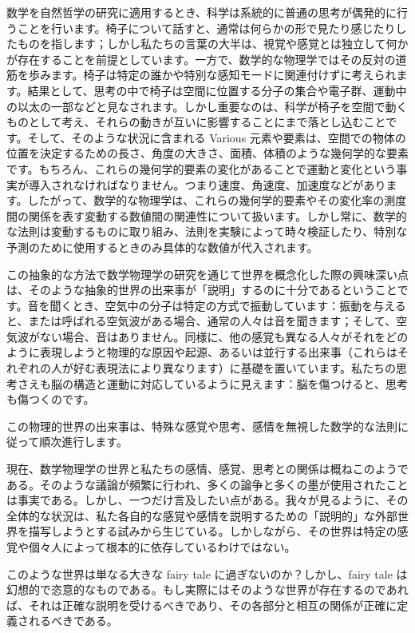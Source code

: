 \documentclass[a4paper,11pt,openany]{ltjsbook}
\begin{document}
数学を自然哲学の研究に適用するとき、科学は系統的に普通の思考が偶発的に行うことを行います。椅子について話すと、通常は何らかの形で見たり感じたりしたものを指します；しかし私たちの言葉の大半は、視覚や感覚とは独立して何かが存在することを前提としています。一方で、数学的な物理学ではその反対の道筋を歩みます。椅子は特定の誰かや特別な感知モードに関連付けずに考えられます。結果として、思考の中で椅子は空間に位置する分子の集合や電子群、運動中の以太の一部などと見なされます。しかし重要なのは、科学が椅子を空間で動くものとして考え、それらの動きが互いに影響することにまで落とし込むことです。そして、そのような状況に含まれる Various 元素や要素は、空間での物体の位置を決定するための長さ、角度の大きさ、面積、体積のような幾何学的な要素です。もちろん、これらの幾何学的要素の変化があることで運動と変化という事実が導入されなければなりません。つまり速度、角速度、加速度などがあります。したがって、数学的な物理学は、これらの幾何学的要素やその変化率の測度間の関係を表す変動する数値間の関連性について扱います。しかし常に、数学的な法則は変動するものに取り組み、法則を実験によって時々検証したり、特別な予測のために使用するときのみ具体的な数値が代入されます。

この抽象的な方法で数学物理学の研究を通じて世界を概念化した際の興味深い点は、そのような抽象的世界の出来事が「説明」するのに十分であるということです。音を聞くとき、空気中の分子は特定の方式で振動しています：振動を与えると、または呼ばれる空気波がある場合、通常の人々は音を聞きます；そして、空気波がない場合、音はありません。同様に、他の感覚も異なる人々がそれをどのように表現しようと物理的な原因や起源、あるいは並行する出来事（これらはそれぞれの人が好む表現法により異なります）に基礎を置いています。私たちの思考さえも脳の構造と運動に対応しているように見えます：脳を傷つけると、思考も傷つくのです。

この物理的世界の出来事は、特殊な感覚や思考、感情を無視した数学的な法則に従って順次進行します。

現在、数学物理学の世界と私たちの感情、感覚、思考との関係は概ねこのようである。そのような議論が頻繁に行われ、多くの論争と多くの墨が使用されたことは事実である。しかし、一つだけ言及したい点がある。我々が見るように、その全体的な状況は、私た各自的な感覚や感情を説明するための「説明的」な外部世界を描写しようとする試みから生じている。しかしながら、その世界は特定の感覚や個々人によって根本的に依存しているわけではない。

このような世界は単なる大きな fairy tale に過ぎないのか？しかし、fairy tale は幻想的で恣意的なものである。もし実際にはそのような世界が存在するのであれば、それは正確な説明を受けるべきであり、その各部分と相互の関係が正確に定義されるべきである。
\end{document}
